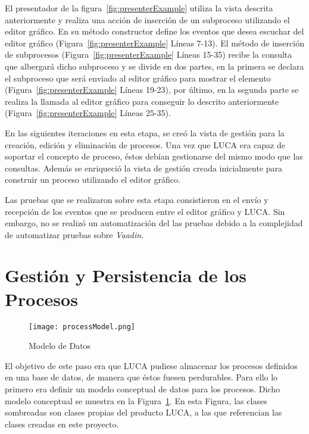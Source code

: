 El presentador de la figura~\ref{fig:presenterExample} utiliza la vista descrita anteriormente y realiza una acción de inserción de un subproceso utilizando el editor gráfico. En su método constructor define los eventos que desea escuchar del editor gráfico (Figura~\ref{fig:presenterExample} Líneas 7-13). El método de inserción de subprocesos (Figura~\ref{fig:presenterExample} Líneas 15-35) recibe la consulta que albergará dicho subproceso y se divide en dos partes, en la primera se declara el subproceso que será enviado al editor gráfico para mostrar el elemento (Figura~\ref{fig:presenterExample} Líneas 19-23), por último, en la segunda parte se realiza la llamada al editor gráfico para conseguir lo descrito anteriormente (Figura~\ref{fig:presenterExample} Líneas 25-35).

En las siguientes iteraciones en esta etapa, se creó la vista de gestión para la creación, edición y eliminación de procesos. Una vez que LUCA era capaz de soportar el concepto de proceso, éstos debían gestionarse del mismo modo que las consultas. Además se enriqueció la vista de gestión creada inicialmente para construir un proceso utilizando el editor gráfico.

Las pruebas que se realizaron sobre esta etapa consistieron en el envío y recepción de los eventos que se producen entre el editor gráfico y LUCA. Sin embargo, no se realizó un automatización del las pruebas debido a la complejidad de automatizar pruebas sobre \emph{Vaadin}.

\section{Gestión y Persistencia de los Procesos}

\begin{figure}[H]
	\centering
	\hspace*{-4.5cm}\texttt{[image: processModel.png]}
	\caption{Modelo de Datos}
	\label{fig:processModel}
\end{figure}

El objetivo de este paso era que LUCA pudiese almacenar los procesos definidos en una base de datos, de manera que éstos fuesen perdurables. Para ello lo primero era definir un modelo conceptual de datos para los procesos. Dicho modelo conceptual se muestra en la Figura~\ref{fig:processModel}. En esta Figura, las clases sombreadas son clases propias del producto LUCA, a las que referencian las clases creadas  en este proyecto.

